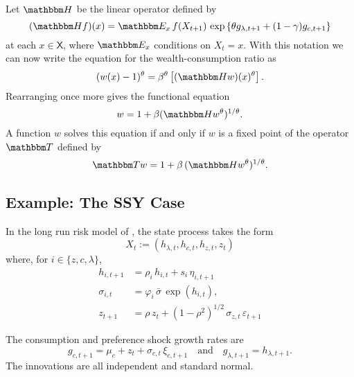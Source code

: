 \documentclass[12pt, reqno]{amsart}
\newcommand{\1}{\mathbbm 1}
\newcommand{\TT}{\mathbbm T}
\newcommand{\HH}{\mathbbm H}
\newcommand{\EE}{\mathbbm E}
\newcommand{\XX}{\mathsf X}
\renewcommand{\phi}{\varphi}
\renewcommand{\epsilon}{\varepsilon}
\theoremstyle{plain}
\theoremstyle{definition}
\begin{document}
Let $\HH$ be the linear operator defined by
%
\begin{equation}\label{eq:defk}
    (\HH f)(x) = \EE_x 
        \, f(X_{t+1})  \,
        \exp
        \left\{ 
            \theta g_{\lambda, t+1} + (1-\gamma) g_{c, t+1}
        \right\}
\end{equation}
%
at each $x \in \XX$,  where $\EE_x$ conditions on $X_t = x$.  With this notation
we can now write the equation for the wealth-consumption ratio as
%
\begin{equation}
    (w(x)-1)^\theta
    = \beta^{\theta}
    \left[
        (\HH w)(x)^\theta
    \right].
    \label{eq:wcnt}
\end{equation}
%
Rearranging once more gives the functional equation
%
\begin{equation}
    w = 1 + \beta ( \HH w^\theta )^{1/\theta}.
    \label{eq:fe}
\end{equation}
%
A function $w$ solves this equation if and only if $w$ is a fixed point
of the operator $\TT$ defined by 
%
\begin{equation}\label{eq:wcop}
    \TT w = 1 + \beta \,  (\HH w^\theta)^{1/\theta}.
\end{equation}
%



\subsection{Example: The SSY Case}

In the long run risk model of \cite{schorfheide2018identifying}, the state
process takes the form 
%
\begin{equation}\label{eq:state}
    X_t := (h_{\lambda, t}, h_{c, t}, h_{z, t}, z_t)  
\end{equation}
%
where, for $i \in \{z, c, \lambda\}$,
%
\begin{align*}
    h_{i, t+1}
        & = \rho_i \, h_{i,t} + s_{i} \, \eta_{i, t+1}
        \\
    \sigma_{i,t} 
        & = \phi_i \, \bar{\sigma} \, \exp(h_{i,t}),
        \\
    z_{t+1} 
        & = \rho \, z_t + (1 - \rho^2)^{1/2} \, 
                \sigma_{z, t} \, \epsilon_{t+1}
\end{align*}
%


The consumption and preference shock growth rates are
%
\begin{equation}\label{eq:ssygc}
    g_{c, t+1}
    = \mu_c + z_t + \sigma_{c, t} \, \xi_{c, t+1} 
    \quad \text{and} \quad
    g_{\lambda, t+1} = h_{\lambda, t+1}.
\end{equation}
%
The innovations are all independent and standard normal.  
\end{document}

